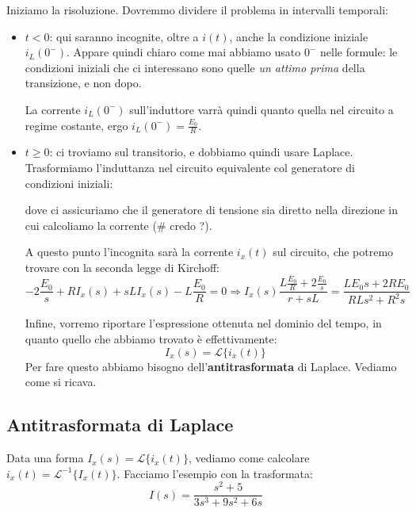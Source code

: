 \documentclass[a4paper,11pt]{article}
\begin{document}
Iniziamo la risoluzione.
Dovremmo dividere il problema in intervalli temporali:
\begin{itemize}
	\item $t < 0$: qui saranno incognite, oltre a $i(t)$, anche la condizione iniziale $i_L(0^-)$.
		Appare quindi chiaro come mai abbiamo usato $0^-$ nelle formule: le condizioni iniziali che ci interessano sono quelle \textit{un attimo prima} della transizione, e non dopo.

		La corrente $i_L(0^-)$ sull'induttore varrà quindi quanto quella nel circuito a regime costante, ergo $i_L(0^-) = \frac{E_0}{R}$.
	\item $t \geq 0$: ci troviamo sul transitorio, e dobbiamo quindi usare Laplace.
		Trasformiamo l'induttanza nel circuito equivalente col generatore di condizioni iniziali:

\begin{center}
\end{center}
dove ci assicuriamo che il generatore di tensione sia diretto nella direzione in cui calcoliamo la corrente (# credo ?).

A questo punto l'incognita sarà la corrente $i_x(t)$ sul circuito, che potremo trovare con la seconda legge di Kirchoff:
$$
-2 \frac{E_0}{s} + R I_x(s) + s L I_x(s) - L \frac{E_0}{R} = 0 \Rightarrow I_x(s) \frac{L \frac{E_0}{R} + 2 \frac{E_0}{s}}{r + s L} = \frac{L E_0 s + 2 R E_0}{R L s^2 + R^2 s}
$$

Infine, vorremo riportare l'espressione ottenuta nel dominio del tempo, in quanto quello che abbiamo trovato è effettivamente:
$$I_x(s) = \mathcal{L}\{ i_x(t) \}$$
Per fare questo abbiamo bisogno dell'\textbf{antitrasformata} di Laplace.
Vediamo come si ricava.
\end{itemize}

\subsection{Antitrasformata di Laplace}
Data una forma $I_x(s) = \mathcal{L}\{ i_x(t) \}$, vediamo come calcolare $ i_x(t) = \mathcal{L}^{-1} \{ I_x(t) \}$.
Facciamo l'esempio con la trasformata:
$$
I(s) = \frac{s^2 + 5}{3s^3 + 9s^2 + 6s}
$$
\end{document}
